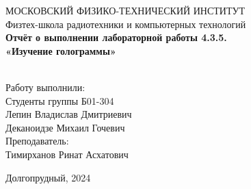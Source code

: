 \begin{center}
МОСКОВСКИЙ ФИЗИКО-ТЕХНИЧЕСКИЙ ИНСТИТУТ \\

\hfill \break
Физтех-школа радиотехники и компьютерных технологий\\
\vspace{5cm}
\large{\textbf{Отчёт о выполнении лабораторной работы 4.3.5. \\ «Изучение голограммы»}}\\
\hfill \break
\\
\end{center}

\vspace{5cm}
 
\begin{flushright}
Работу выполнили:\\
Студенты группы Б01-304\\
Лепин Владислав Дмитриевич\\
Деканоидзе Михаил Гочевич\\
Преподаватель:\\
Тимирханов Ринат Асхатович\\
\end{flushright}
 
\vfill


\begin{center} Долгопрудный, 2024 \end{center}

\thispagestyle{empty}
\newpage